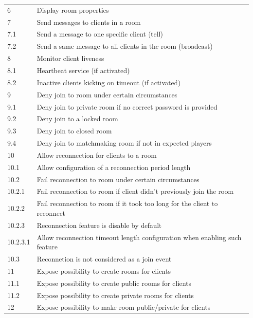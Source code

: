 \begin{center}
\begin{longtable}{|l|l|}
6        & Display room properties \\
7        & Send messages to clients in a room \\
7.1      & Send a message to one specific client (tell) \\
7.2      & Send a same message to all clients in the room (broadcast) \\
8        & Monitor client liveness \\
8.1      & Heartbeat service (if activated) \\
8.2      & Inactive clients kicking on timeout (if activated) \\
9        & Deny join to room under certain circumstances \\
9.1      & Deny join to private room if no correct password is provided \\
9.2      & Deny join to a locked room \\
9.3      & Deny join to closed room \\
9.4      & Deny join to matchmaking room if not in expected players \\
10        & Allow reconnection for clients to a room \\
10.1      & Allow configuration of a reconnection period length \\
10.2      & Fail reconnection to room under certain circumstances \\
10.2.1    & Fail reconnection to room if client didn't previously join the room \\
10.2.2    & Fail reconnection to room if it took too long for the client to reconnect \\
10.2.3    & Reconnection feature is disable by default \\
10.2.3.1  & Allow reconnection timeout length configuration when enabling such feature \\
10.3      & Reconnetion is not considered as a join event \\
11        & Expose possibility to create rooms for clients \\
11.1      & Expose possibility to create public rooms for clients \\
11.2      & Expose possibility to create private rooms for clients \\
12        & Expose possibility to make room public/private for clients \\
\hline

  \end{longtable}
\end{center}

